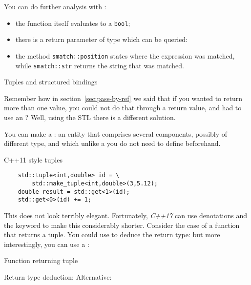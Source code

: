 
You can do further analysis with :
\begin{itemize}
\item the function itself evaluates to a \lstinline{bool};
\item there is a return parameter of type  which can
  be queried:
\item the method \lstinline{smatch::position} states where the expression
  was matched, while \lstinline{smatch::str} returns the string that
  was matched.
\end{itemize}


 {Tuples and structured bindings}
\label{sec:tuple}

Remember how in section~\ref{sec:pass-by-ref} we said that if you
wanted to return more than one value, you could not do that through a
return value, and had to use an ?
Well, using the \ac{STL} there is a different solution.

You can make a : an entity that comprises several
components, possibly of different type, and which unlike a
 you do not need to define beforehand.

\lstset{style=reviewcode,language=C++}
\begin{block}{C++11 style tuples}
  \label{sl:tuple11}
  \begin{lstlisting}
    std::tuple<int,double> id = \
        std::make_tuple<int,double>(3,5.12);
    double result = std::get<1>(id);
    std::get<0>(id) += 1;
  \end{lstlisting}
\end{block}

This does not look terribly elegant. Fortunately,
\emph{C++17} can use denotations and the 
keyword to make this considerably shorter. Consider the case of a
function that returns a tuple. You could use \n{auto} to deduce the
return type:
%
%
but more interestingly, you can use a
:
%

\begin{slide}{Function returning tuple}
  \label{sl:tuplefun}
  \begin{multicols}{2}
    Return type deduction:
    \columnbreak
    Alternative:
  \end{multicols}
\end{slide}

